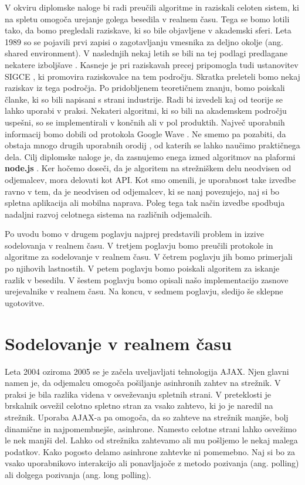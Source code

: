 \documentclass[a4paper, 12pt, twoside]{book}
\begin{document}
V okviru diplomske naloge bi radi preučili algoritme in raziskali celoten sistem, ki na spletu omogoča urejanje golega besedila v realnem času. Tega se bomo lotili tako, da bomo pregledali raziskave, ki so bile objavljene v akademski sferi. Leta 1989 so se pojavili prvi zapisi \cite{ccigs} o zagotavljanju vmesnika za deljno okolje  (ang. shared environment). V naslednjih nekaj letih se bili na tej podlagi predlagane nekatere izboljšave \cite{hllbw}. Kasneje je pri raziskavah precej pripomogla tudi ustanovitev SIGCE \cite{sigce}, ki promovira raziskovalce na tem področju. Skratka preleteli bomo nekaj raziskav iz tega področja. Po pridobljenem teoretičnem znanju, bomo poiskali članke, ki so bili napisani s strani industrije. Radi bi izvedeli kaj od teorije se lahko uporabi v praksi. Nekateri algoritmi, ki so bili na akademskem področju uspešni, so se implementirali v končnih ali v pol produktih. Največ uporabnih informacij bomo dobili od protokola Google Wave \cite{wave-ot}. Ne smemo pa pozabiti, da obstaja mnogo drugih uporabnih orodij \cite{share}, od katerih se lahko naučimo praktičnega dela. Cilj diplomske naloge je, da zasnujemo enega izmed algoritmov na plaformi \textbf{node.js} \cite{node}.  Ker hočemo doseči, da je algoritem na strežniškem delu neodvisen od odjemalcev, mora delovati kot API. Kot smo omenili, je uporabnost take izvedbe ravno v tem, da je neodvisen od odjemalcev, ki se nanj povezujejo, naj si bo spletna aplikacija ali mobilna naprava. Poleg tega tak način izvedbe spodbuja nadaljni razvoj celotnega sistema na različnih odjemalcih.

Po uvodu bomo v drugem poglavju najprej predstavili problem in izzive sodelovanja v realnem času. V tretjem poglavju bomo preučili protokole in algoritme za sodelovanje v realnem času. V četrem poglavju jih bomo primerjali po njihovih lastnostih. V petem poglavju bomo poiskali algoritem za iskanje razlik v besedilu. V šestem poglavju bomo opisali našo implementacijo zasnove urejevalnike v realnem času. Na koncu, v sedmem poglavju, sledijo še sklepne ugotovitve.

\chapter{Sodelovanje v realnem času}

Leta 2004 oziroma 2005 se je začela uveljavljati tehnologija AJAX. Njen glavni namen je, da odjemalcu omogoča pošiljanje asinhronih zahtev na strežnik. V praksi je bila razlika videna v osveževanju spletnih strani. V preteklosti je brskalnik osvežil celotno spletno stran za vsako zahtevo, ki jo je naredil na strežnik. Uporaba AJAX-a pa omogoča, da so zahteve na strežnik manjše, bolj dinamične in najpomembnejše, asinhrone. Namesto celotne strani lahko osvežimo le nek manjši del. Lahko od strežnika zahtevamo ali mu pošljemo le nekaj malega podatkov. Kako pogosto delamo asinhrone zahtevke ni pomemebno. Naj si bo za vsako uporabnikovo interakcijo ali ponavljajoče z metodo pozivanja (ang. polling) \cite{diffsync} ali dolgega pozivanja (ang. long polling).
\end{document}
